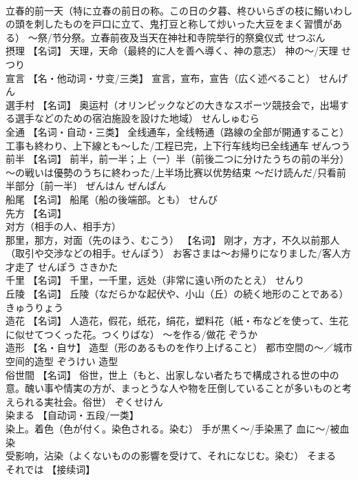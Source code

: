\documentclass[8pt]{extreport}
\begin{document}
\begin{CJK}{UTF8}{min}
\\	立春的前一天（特に立春の前日の称。この日の夕暮、柊ひいらぎの枝に鰯いわしの頭を刺したものを戸口に立て、鬼打豆と称して炒いった大豆をまく習慣がある） ～祭/节分祭。立春前夜及当天在神社和寺院举行的祭奠仪式	せつぶん	
\\	摂理	【名词】 天理，天命（最終的に人を善へ導く、神の意志） 神の～/天理	せつり	
\\	宣言	【名・他动词・サ变/三类】 宣言，宣布，宣告（広く述べること）	せんげん	
\\	選手村	【名词】 奥运村（オリンピックなどの大きなスポーツ競技会で，出場する選手などのための宿泊施設を設けた地域）	せんしゅむら	
\\	全通	【名词・自动・三类】 全线通车，全线畅通（路線の全部が開通すること） 工事も終わり、上下線とも～した/工程已完，上下行车线均已全线通车	ぜんつう	
\\	前半	【名词】 前半，前一半；上（一）半（前後二つに分けたうちの前の半分） ～の戦いは優勢のうちに終わった/上半场比赛以优势结束 ～だけ読んだ/只看前半部分〔前一半〕	ぜんはん ぜんぱん	
\\	船尾	【名词】 船尾（船の後端部。とも）	せんび	
\\	先方	【名词】 
\\	对方（相手の人、相手方） 
\\	那里，那方，对面（先のほう、むこう） 【名词】 刚才，方才，不久以前那人（取引や交渉などの相手。せんぽう） お客さまは～お帰りになりました/客人方才走了	せんぽう さきかた	
\\	千里	【名词】 千里，一千里，远处（非常に遠い所のたとえ）	せんり	
\\	丘陵	【名词】 丘陵（なだらかな起伏や、小山（丘）の続く地形のことである）	きゅうりょう	
\\	造花	【名词】 人造花，假花，纸花，绢花，塑料花（紙・布などを使って、生花に似せてつくった花。つくりばな） ～を作る/做花	ぞうか	
\\	造形	【名・自サ】 造型（形のあるものを作り上げること） 都市空間の～／城市空间的造型	ぞうけい	造型
\\	俗世間	【名词】 俗世，世上（もと、出家しない者たちで構成される世の中の意。醜い事や情実の方が、まっとうな人や物を圧倒していることが多いものと考えられる実社会。俗世）	ぞくせけん	
\\	染まる	【自动词・五段/一类】 
\\	染上。着色（色が付く。染色される。染む） 手が黒く～/手染黑了 血に～/被血染 
\\	受影响，沾染（よくないものの影響を受けて、それになじむ。染む）	そまる	
\\	それでは	【接续词】 

\end{CJK}
\end{document}
